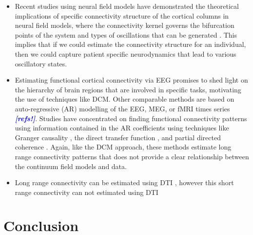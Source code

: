 \documentclass[twocolumn,11pt,a4paper]{article}		%
\newcommand{\todo}[1]{\textsf{\emph{\textbf{\textcolor{blue}{#1}}}}}
\begin{document}
\begin{itemize}
	\item Recent studies using neural field models have demonstrated the theoretical implications of specific connectivity structure of the cortical columns in neural field models, where the connectivity kernel governs the bifurcation points of the system \cite{Hutt2005} and types of oscillations that can be generated \cite{Schmidt2009}. This implies that if we could estimate the connectivity structure for an individual, then we could capture patient specific neurodynamics that lead to various oscillatory states.
	\item Estimating functional cortical connectivity via EEG promises to shed light on the hierarchy of brain regions that are involved in specific tasks, motivating the use of techniques like DCM. Other comparable methods are based on auto-regressive (AR) modelling of the EEG, MEG, or fMRI times series \todo{[refs!]}. Studies have concentrated on finding functional connectivity patterns using information contained in the AR coefficients using techniques like Granger causality \cite{Hesse2003}, the direct transfer function \cite{Kaminski1991}, and partial directed coherence \cite{Sameshima1999}. Again, like the DCM approach, these methods estimate long range connectivity patterns that does not provide a clear relationship between the continuum field models and data.
	\item Long range connectivity can be estimated using DTI \cite{Knock2009}, however this short range connectivity can not estimated using DTI
\end{itemize}

\section{Conclusion}\label{ConclusionSection}
\appendix 
\end{document}
